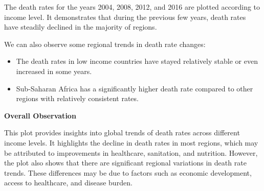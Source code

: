 \documentclass{article}\usepackage[]{graphicx}\usepackage[]{xcolor}
\begin{document}
The death rates for the years 2004, 2008, 2012, and 2016 are plotted according to income level. It demonstrates that during the previous few years, death rates have steadily declined in the majority of regions. \hfill \break

We can also observe some regional trends in death rate changes:
\begin{itemize}
\item{The death rates in low income countries have stayed relatively stable or even increased in some years.}
\item{Sub-Saharan Africa has a significantly higher death rate compared to other regions with relatively consistent rates.}

\end{itemize}
\textbf{Overall Observation}

This plot provides insights into global trends of death rates across different income levels. It highlights the decline in death rates in most regions, which may be attributed to improvements in healthcare, sanitation, and nutrition. However, the plot also shows that there are significant regional variations in death rate trends. These differences may be due to factors such as economic development, access to healthcare, and disease burden.
\end{document}

